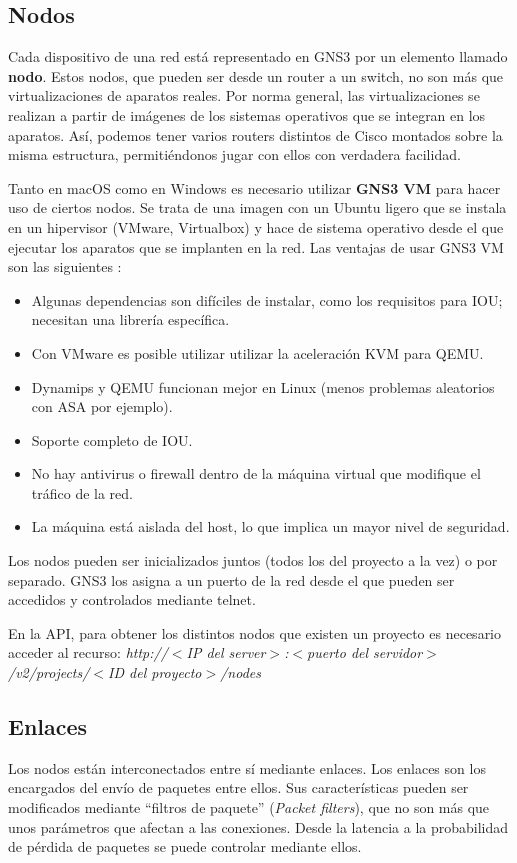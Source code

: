 \subsection{Nodos}
Cada dispositivo de una red está representado en GNS3 por un elemento llamado \textbf{nodo}. Estos nodos, que pueden ser desde un router a un switch, no son más que virtualizaciones de aparatos reales. Por norma general, las virtualizaciones se realizan a partir de imágenes de los sistemas operativos que se integran en los aparatos. Así, podemos tener varios routers distintos de Cisco montados sobre la misma estructura, permitiéndonos jugar con ellos con verdadera facilidad.

Tanto en macOS como en Windows es necesario utilizar \textbf{GNS3 VM} para hacer uso de ciertos nodos. Se trata de una imagen con un Ubuntu ligero que se instala en un hipervisor (VMware, Virtualbox) y hace de sistema operativo desde el que ejecutar los aparatos que se implanten en la red. Las ventajas de usar GNS3 VM son las siguientes \cite{gns3vm}:
\begin{itemize}
\item Algunas dependencias son difíciles de instalar, como los requisitos para IOU; necesitan una librería específica.
\item Con VMware es posible utilizar utilizar la aceleración KVM para QEMU.
\item Dynamips y QEMU funcionan mejor en Linux (menos problemas aleatorios con ASA por ejemplo).
\item Soporte completo de IOU.
\item No hay antivirus o firewall dentro de la máquina virtual que modifique el tráfico de la red.
\item La máquina está aislada del host, lo que implica un mayor nivel de seguridad.
\end{itemize}

Los nodos pueden ser inicializados juntos (todos los del proyecto a la vez) o por separado. GNS3 los asigna a un puerto de la red desde el que pueden ser accedidos y controlados mediante telnet.

En la API, para obtener los distintos nodos que existen un proyecto es necesario acceder al recurso: \textit{http://$<$IP del server$>$:$<$puerto del servidor$>$/v2/projects/$<$ID del proyecto$>$/nodes}

\subsection{Enlaces}
Los nodos están interconectados entre sí mediante enlaces. Los enlaces son los encargados del envío de paquetes entre ellos. Sus características pueden ser modificados mediante ``filtros de paquete'' (\textit{Packet filters}), que no son más que unos parámetros que afectan a las conexiones. Desde la latencia a la probabilidad de pérdida de paquetes se puede controlar mediante ellos.

